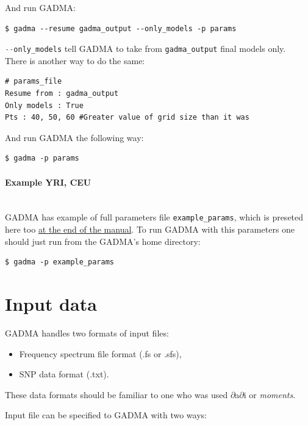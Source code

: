 \documentclass[12pt]{article}
\makeatletter
\newcommand{\dadi}{$\partial$a$\partial$i\xspace}
\newcommand{\moments}{\textit{moments}\xspace}
\newcommand{\py}[1]{\lstinline[language=Python, showstringspaces=False]@#1@}
\makeatother
\begin{document}
And run GADMA:
\begin{lstlisting}
$ gadma --resume gadma_output --only_models -p params 
\end{lstlisting}

\py{--only_models} tell GADMA to take from \py{gadma_output} final models only. \\

There is another way to do the same:
\begin{lstlisting}
# params_file
Resume from : gadma_output
Only models : True
Pts : 40, 50, 60 #Greater value of grid size than it was
\end{lstlisting}

And run GADMA the following way:
\begin{lstlisting}
$ gadma -p params
\end{lstlisting}

\paragraph{Example YRI, CEU}\mbox{}\\
GADMA has example of full parameters file \py{example_params}, which is preseted here too \hyperref[sec:example-params]{at the end of the manual}. To run GADMA with this parameters one should just run from the GADMA's home directory:
\begin{lstlisting}
$ gadma -p example_params
\end{lstlisting}


\section{Input data}

GADMA handles two formats of input files:
\begin{itemize}
    \item Frequency spectrum file format (.fs or .sfs),
    \item SNP data format (.txt).
\end{itemize}

These data formats should be familiar to one who was used \dadi or \moments.

Input file can be specified to GADMA with two ways:
\end{document}
